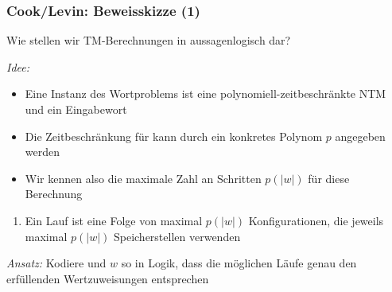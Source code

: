 \documentclass[onlymath]{beamer}
\begin{document}
\begin{frame}\frametitle{Cook/Levin: Beweisskizze (1)}

\alert{Wie stellen wir TM-Berechnungen in aussagenlogisch dar?}
\bigskip

\emph{Idee:}
\begin{itemize}
\item Eine Instanz des Wortproblems ist eine polynomiell-zeitbeschränkte NTM  und ein Eingabewort
\item Die Zeitbeschränkung für  kann durch ein konkretes Polynom $p$ angegeben werden
\item Wir kennen also die maximale Zahl an Schritten $p(|w|)$ für diese Berechnung
\end{itemize}
\begin{enumerate}[$\leadsto$]
\item Ein Lauf ist eine Folge von maximal $p(|w|)$ Konfigurationen, die jeweils maximal $p(|w|)$ Speicherstellen verwenden
\end{enumerate}
\bigskip

\emph{Ansatz:} Kodiere  und $w$ so in Logik, dass die möglichen Läufe genau den erfüllenden Wertzuweisungen entsprechen

\end{frame}
\end{document}

